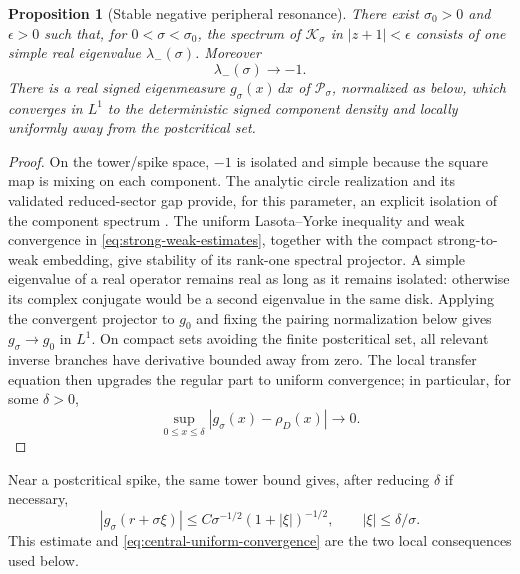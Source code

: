 \documentclass[11pt]{article}
\newtheorem{proposition}[theorem]{Proposition}
\theoremstyle{definition}
\theoremstyle{remark}
\newcommand{\cK}{\mathcal K}
\newcommand{\cP}{\mathcal P}
\begin{document}
\begin{proposition}[Stable negative peripheral resonance]
\label{prop:spectral-stability}
There exist $\sigma_0>0$ and $\epsilon>0$ such that, for
$0<\sigma<\sigma_0$, the spectrum of $\cK_\sigma$ in
$|z+1|<\epsilon$ consists of one simple real eigenvalue
$\lambda_-(\sigma)$.  Moreover
\begin{equation}\label{eq:lambda-convergence}
 \lambda_-(\sigma)\longrightarrow-1.
\end{equation}
There is a real signed eigenmeasure
$g_\sigma(x)\,dx$ of $\cP_\sigma$, normalized as below, which converges in
$L^1$ to the deterministic signed component density and locally uniformly
away from the postcritical set.
\end{proposition}

\begin{proof}
On the tower/spike space, $-1$ is isolated and simple because the square map is
mixing on each component.  The analytic circle realization and its validated
reduced-sector gap provide, for this parameter, an explicit isolation of the
component spectrum \citep{WangValidatedGap2026}.  The uniform
Lasota--Yorke inequality and weak convergence in
\eqref{eq:strong-weak-estimates}, together with the compact strong-to-weak
embedding, give stability of its rank-one spectral projector.  A simple
eigenvalue of a real operator remains real as long as it remains isolated:
otherwise its complex conjugate would be a second eigenvalue in the same
disk.  Applying the convergent projector to $g_0$ and fixing the pairing
normalization below gives $g_\sigma\to g_0$ in $L^1$.  On compact sets
avoiding the finite postcritical set, all relevant inverse branches have
derivative bounded away from zero.  The local transfer equation then upgrades
the regular part to uniform convergence; in particular, for some $\delta>0$,
\begin{equation}\label{eq:central-uniform-convergence}
 \sup_{0\le x\le\delta}|g_\sigma(x)-\rho_D(x)|\longrightarrow0.
\end{equation}
\end{proof}

Near a postcritical spike, the same tower bound gives, after reducing
$\delta$ if necessary,
\begin{equation}\label{eq:spike-majorant}
 |g_\sigma(r+\sigma\xi)|
 \le C\sigma^{-1/2}(1+|\xi|)^{-1/2},
 \qquad |\xi|\le\delta/\sigma.
\end{equation}
This estimate and \eqref{eq:central-uniform-convergence} are the two local
consequences used below.
\end{document}
